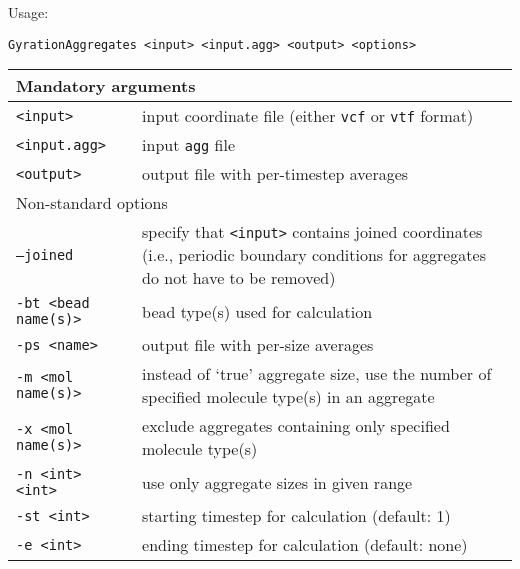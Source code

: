 Usage:

\vspace{1em}
\noindent
\texttt{GyrationAggregates <input> <input.agg> <output> <options>}

\noindent
\begin{longtable}{p{}p{}}
  \toprule
  \multicolumn{2}{l}{Mandatory arguments} \\
  \midrule
  \texttt{<input>} & input coordinate file (either \texttt{vcf} or
    \texttt{vtf} format) \\
  \texttt{<input.agg>} & input \texttt{agg} file \\
  \texttt{<output>} & output file with per-timestep averages \\
  \toprule
  \multicolumn{2}{l}{Non-standard options} \\
  \midrule
  \texttt{--joined} & specify that \texttt{<input>} contains joined
    coordinates (i.e., periodic boundary conditions for aggregates do not
    have to be removed) \\
  \texttt{-bt <bead name(s)>} & bead type(s) used for calculation \\
  \texttt{-ps <name>} & output file with per-size averages \\
  \texttt{-m <mol name(s)>} & instead of `true' aggregate size, use the number
    of specified molecule type(s) in an aggregate \\
  \texttt{-x <mol name(s)>} & exclude aggregates containing only specified
    molecule type(s) \\
  \texttt{-n <int> <int>} & use only aggregate sizes in given range \\
  \texttt{-st <int>} & starting timestep for calculation (default: 1) \\
  \texttt{-e <int>} & ending timestep for calculation (default: none) \\
  \bottomrule
\end{longtable}

